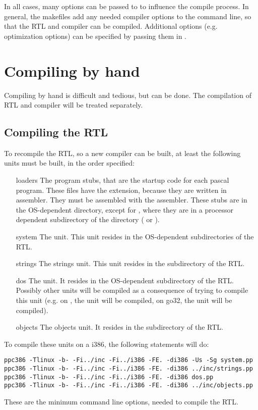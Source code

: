 In all cases, many options can be passed to  to influence the
compile process. In general, the makefiles add any needed compiler options
to the command line, so that the RTL and compiler can be compiled. 
Additional options (e.g. optimization options) can be specified by passing them in
.

\section{Compiling by hand}

Compiling by hand is difficult and tedious, but can be done. The 
compilation of RTL and compiler will be treated separately.

\subsection{Compiling the RTL}
To recompile the RTL, so a new compiler can be built, at least the following
units must be built, in the order specified:
\begin{enumerate}
\item[loaders] The program stubs, that are the startup code for each pascal
program. These files have the  extension, because they are written
in assembler. They must be assembled with the \gnu {} assembler. These stubs
are in the OS-dependent directory, except for \linux, where they are in a
processor dependent subdirectory of the \linux directory ( or
).
\item[system] The  unit. This unit resides in the OS-dependent 
subdirectories of the RTL.
\item[strings] The strings unit. This unit resides in the 
subdirectory of the RTL.
\item[dos] The  unit. It resides in the OS-dependent subdirectory
of the RTL. Possibly other units will be compiled as a consequence of trying
to compile this unit (e.g. on \linux, the  unit will be
compiled, on go32, the  unit will be compiled).
\item[objects] The objects unit. It resides in the  subdirectory
of the RTL.
\end{enumerate}
To compile these units on a i386, the following statements will do:
\begin{verbatim}
ppc386 -Tlinux -b- -Fi../inc -Fi../i386 -FE. -di386 -Us -Sg system.pp
ppc386 -Tlinux -b- -Fi../inc -Fi../i386 -FE. -di386 ../inc/strings.pp
ppc386 -Tlinux -b- -Fi../inc -Fi../i386 -FE. -di386 dos.pp
ppc386 -Tlinux -b- -Fi../inc -Fi../i386 -FE. -di386 ../inc/objects.pp
\end{verbatim}
These are the minimum command line options, needed to compile the RTL.

